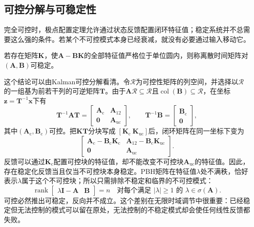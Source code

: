 \subsection{可控分解与可稳定性}
完全可控时，极点配置定理允许通过状态反馈配置闭环特征值；稳定系统并不总需要这么强的条件。若某个不可控模式本身已经衰减，就没有必要通过输入移动它。
\begin{definition}[可稳定性]
\label{def:control-stabilizability}
若存在矩阵$\bm{K}$，使$\bm{A}-\bm{B}\bm{K}$的全部特征值严格位于单位圆内，则称离散时间矩阵对$(\bm{A},\bm{B})$可稳定。
\end{definition}

这个结论可以由Kalman可控分解看清。令$\mathcal{R}$为可控性矩阵的列空间，并选择以$\mathcal{R}$的一组基为前若干列的可逆矩阵$\bm{T}$。由于$\bm{A}\mathcal{R}\subseteq\mathcal{R}$且$\operatorname{col}(\bm{B})\subseteq\mathcal{R}$，在坐标$\bm{z}=\bm{T}^{-1}\bm{x}$下有
\[
  \bm{T}^{-1}\bm{A}\bm{T}
  =
  \begin{bmatrix}
    \bm{A}_{\mathrm c}&\bm{A}_{12}\\
    \bm{0}&\bm{A}_{\mathrm{uc}}
  \end{bmatrix},
  \qquad
  \bm{T}^{-1}\bm{B}
  =
  \begin{bmatrix}
    \bm{B}_{\mathrm c}\\
    \bm{0}
  \end{bmatrix},
\]
其中$(\bm{A}_{\mathrm c},\bm{B}_{\mathrm c})$可控。把$\bm{K}\bm{T}$分块写成
$[\bm{K}_{\mathrm c}\ \bm{K}_{\mathrm{uc}}]$后，闭环矩阵在同一坐标下变为
\[
  \begin{bmatrix}
    \bm{A}_{\mathrm c}-\bm{B}_{\mathrm c}\bm{K}_{\mathrm c}
    &
    \bm{A}_{12}-\bm{B}_{\mathrm c}\bm{K}_{\mathrm{uc}}\\
    \bm{0}&\bm{A}_{\mathrm{uc}}
  \end{bmatrix}.
\]
反馈可以通过$\bm{K}_{\mathrm c}$配置可控块的特征值，却不能改变不可控块$\bm{A}_{\mathrm{uc}}$的特征值。因此，存在稳定化反馈当且仅当不可控块本身稳定。PBH矩阵在特征值$\lambda$处不满秩，恰好表示$\lambda$属于这个不可控块；所以只需排除不稳定和临界的不可控模式：
\begin{equation}
  \operatorname{rank}
  \begin{bmatrix}
    \lambda\bm{I}-\bm{A}&\bm{B}
  \end{bmatrix}
  =n
  \quad
  \text{对每个满足 }|\lambda|\geq1
  \text{ 的 }\lambda\in\sigma(\bm{A}).
  \label{eq:control-pbh-stabilizability}
\end{equation}
可控必然推出可稳定，反向并不成立。这个差别在无限时域调节中很重要：已经稳定但无法控制的模式可以留在原处，无法控制的不稳定模式却会使任何线性反馈都失败。
